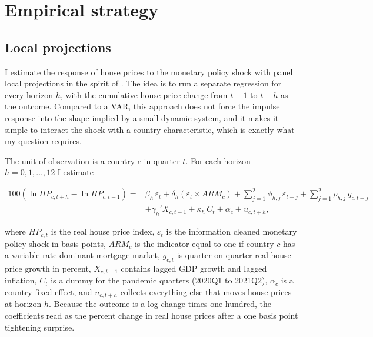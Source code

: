 \section{Empirical strategy}
\label{sec:strategy}

\subsection{Local projections}

I estimate the response of house prices to the monetary policy shock with
panel local projections in the spirit of \citet{jorda2005}. The idea is to
run a separate regression for every horizon $h$, with the cumulative house
price change from $t-1$ to $t+h$ as the outcome. Compared to a VAR, this
approach does not force the impulse response into the shape implied by a
small dynamic system, and it makes it simple to interact the shock with a
country characteristic, which is exactly what my question requires.

The unit of observation is a country $c$ in quarter $t$. For each horizon
$h = 0, 1, \ldots, 12$ I estimate

\begin{equation}
\label{eq:lp}
\begin{split}
100 \left( \ln HP_{c,t+h} - \ln HP_{c,t-1} \right)
= {} & \beta_h \, \varepsilon_t
+ \delta_h \left( \varepsilon_t \times ARM_c \right)
+ \sum_{j=1}^{2} \phi_{h,j} \, \varepsilon_{t-j}
+ \sum_{j=1}^{2} \rho_{h,j} \, g_{c,t-j} \\
& + \gamma_h' X_{c,t-1}
+ \kappa_h \, C_t
+ \alpha_c
+ u_{c,t+h},
\end{split}
\end{equation}

where $HP_{c,t}$ is the real house price index, $\varepsilon_t$ is the
information cleaned monetary policy shock in basis points, $ARM_c$ is the
indicator equal to one if country $c$ has a variable rate dominant mortgage
market, $g_{c,t}$ is quarter on quarter real house price growth in percent,
$X_{c,t-1}$ contains lagged GDP growth and lagged inflation, $C_t$ is a dummy
for the pandemic quarters (2020Q1 to 2021Q2), $\alpha_c$ is a country fixed
effect, and $u_{c,t+h}$ collects everything else that moves house prices at
horizon $h$. Because the outcome is a log change times one hundred, the
coefficients read as the percent change in real house prices after a one
basis point tightening surprise.

